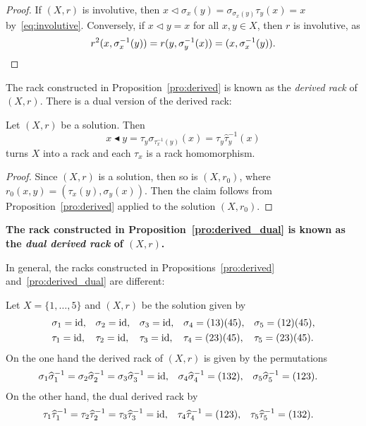 \begin{proof}
    If $(X,r)$ is involutive, 
    then $x\triangleleft\sigma_x(y)=\sigma_{\sigma_x(y)}\tau_y(x)=x$ by~\eqref{eq:involutive}. 
    Conversely, if $x\triangleleft y=x$ for all $x,y\in X$,
    then $r$ is involutive, as 
    \[
    r^2(x,\sigma_x^{-1}(y))=r(y,\sigma_y^{-1}(x))=(x,\sigma_x^{-1}(y)).\qedhere
    \]
\end{proof}

The rack constructed in Proposition~\ref{pro:derived} is 
known as the \emph{derived rack} of $(X,r)$. 
There is a dual version of the derived rack:

\begin{proposition}
    \label{pro:derived_dual}
    Let $(X,r)$ be a solution. Then 
    \[
    x\blacktriangleleft y=\tau_y\sigma_{\tau_x^{-1}(y)}(x)=\tau_y\widehat{\tau}^{-1}_y(x)
    \]
    turns $X$ into a rack and each $\tau_x$ is a rack homomorphism. 
\end{proposition}

\begin{proof}
    Since $(X,r)$ is a solution, then so is $(X,r_0)$, where 
    $r_0(x,y)=(\tau_x(y),\sigma_y(x))$. Then the claim follows 
    from Proposition~\ref{pro:derived} applied to 
    the solution $(X,r_0)$.
\end{proof}

{\bf The rack constructed in Proposition~\ref{pro:derived_dual} is 
known as the \emph{dual derived rack} of $(X,r)$.} 


In general, the racks constructed in Propositions~\ref{pro:derived} 
and~\ref{pro:derived_dual} are different:

\begin{example}
Let $X=\{1,\dots,5\}$ and $(X,r)$ be the solution given by
\begin{align*}
&\sigma_1=\operatorname{id}, && \sigma_2=\operatorname{id}, && \sigma_3=\operatorname{id}, && \sigma_4=(13)(45), &&\sigma_5=(12)(45),\\
&\tau_1=\operatorname{id}, && \tau_2=\operatorname{id}, && \tau_3=\operatorname{id}, && \tau_4=(23)(45), &&\tau_5=(23)(45).
\end{align*}
On the one hand the derived rack of $(X,r)$ is given by the permutations 
\begin{align*}
&\sigma_1\widehat{\sigma}_1^{-1}=\sigma_2\widehat{\sigma}_2^{-1}=\sigma_3\widehat{\sigma}_3^{-1}=\operatorname{id},
&&\sigma_4\widehat{\sigma}_4^{-1}=(132),
&&\sigma_5\widehat{\sigma}_5^{-1}=(123).
\end{align*}
On the other hand, the dual derived rack by 
\begin{align*}
&\tau_1\widehat{\tau}_1^{-1}=\tau_2\widehat{\tau}_2^{-1}=\tau_3\widehat{\tau}_3^{-1}=\operatorname{id},
&&\tau_4\widehat{\tau}_4^{-1}=(123),
&&\tau_5\widehat{\tau}_5^{-1}=(132).
\end{align*}
\end{example}

